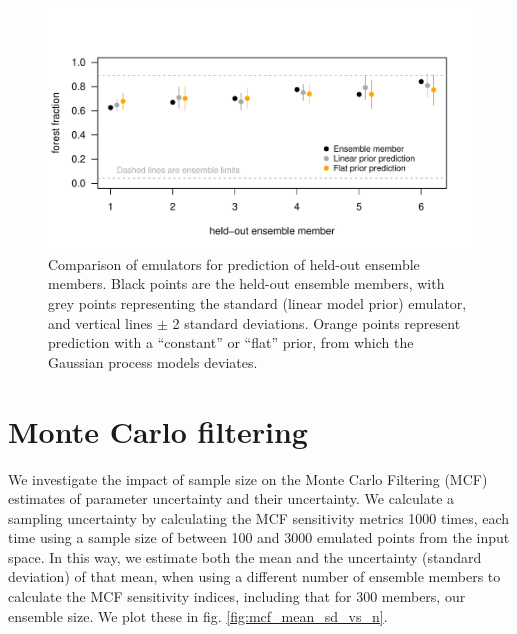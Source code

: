 \documentclass[gmd, manuscript]{copernicus} %
\begin{document}
\begin{figure}[t]
\includegraphics[width=12cm]{../graphics/figS05.pdf}
\caption{Comparison of emulators for prediction of held-out ensemble members. Black points are the held-out ensemble members, with grey points representing the standard (linear model prior) emulator, and vertical lines $\pm$ 2 standard deviations. Orange points represent prediction with a ``constant'' or ``flat'' prior, from which the Gaussian process models deviates.}
\label{fig:loo_v_holdout_flat_prediction_error}
\end{figure}


\section{Monte Carlo filtering}

We investigate the impact of sample size on the Monte Carlo Filtering (MCF) estimates of parameter uncertainty and their uncertainty. We calculate a sampling uncertainty by calculating the MCF sensitivity metrics 1000 times, each time using a sample size of between 100 and 3000 emulated points from the input space. In this way, we estimate both the mean and the uncertainty (standard deviation) of that mean, when using a different number of ensemble members to calculate the MCF sensitivity indices, including that for 300 members, our ensemble size. We plot these in fig. \ref{fig:mcf_mean_sd_vs_n}.
\end{document}
